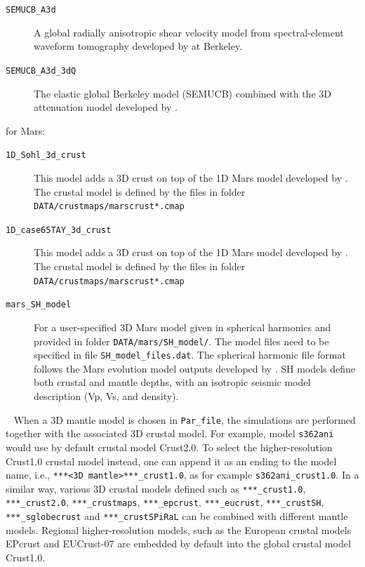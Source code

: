 \begin{description}
\begin{description}
%
\item [{\texttt{SEMUCB\_A3d}}] A global radially anisotropic shear velocity model from spectral-element waveform tomography developed by \citet{FrRo2014} at Berkeley.
%
\item [{\texttt{SEMUCB\_A3d\_3dQ}}] The elastic global Berkeley model (SEMUCB) combined with the 3D attenuation model developed by \citet{KaRo2018}.
%
\end{description}
for Mars:
\begin{description}
%
\item [{\texttt{1D\_Sohl\_3d\_crust}}] This model adds a 3D crust on top of the 1D Mars model developed by \citet{Sohl1997}.
The crustal model is defined by the files in folder \texttt{DATA/crustmaps/marscrust*.cmap}
%
\item [{\texttt{1D\_case65TAY\_3d\_crust}}] This model adds a 3D crust on top of the 1D Mars model developed by \citet{Plesa2021}.
The crustal model is defined by the files in folder \texttt{DATA/crustmaps/marscrust*.cmap}
%
\item [{\texttt{mars\_SH\_model}}] For a user-specified 3D Mars model given in spherical harmonics and provided in folder \texttt{DATA/mars/SH\_model/}. The model files need to be specified in file \texttt{SH\_model\_files.dat}. The spherical harmonic file format follows the Mars evolution model outputs developed by \citet{Plesa2021}. SH models define both crustal and mantle depths, with an isotropic seismic model description (Vp, Vs, and density).
%
\end{description}

\item [{\textmd{Note:}}]~\newline
When a 3D mantle model is chosen in \texttt{Par\_file}, the simulations are performed together with the associated 3D crustal model. For example, model \texttt{s362ani} would use by default crustal model Crust2.0.
To select the higher-resolution Crust1.0 crustal model instead, one can append it as an ending to the model name, i.e., \texttt{***<3D mantle>***\_crust1.0}, as for example \texttt{s362ani\_crust1.0}. In a similar way, various 3D crustal models defined such as \texttt{***\_crust1.0}, \texttt{***\_crust2.0}, \texttt{***\_crustmaps}, \texttt{***\_epcrust}, \texttt{***\_eucrust}, \texttt{***\_crustSH}, \texttt{***\_sglobecrust} and \texttt{***\_crustSPiRaL} can be combined with different mantle models.
Regional higher-resolution models, such as the European crustal models EPcrust \citep{Molinari2011} and EUCrust-07 \citep{EUCrust07} are embedded by default into the global crustal model Crust1.0.


\end{description}
